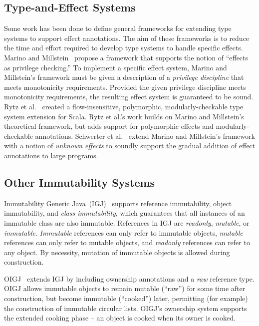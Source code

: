 \documentclass[letterpaper,11pt]{article}
\theoremstyle{definition}
\theoremstyle{remark}
\begin{document}
\subsection{Type-and-Effect Systems}

Some work has been done to define general frameworks for extending type systems
to support effect annotations. The aim of these frameworks is to reduce the
time and effort required to develop type systems to handle specific effects.
Marino and Millstein~\cite{generic-type-and-effect} propose a framework that
supports the notion of ``effects as privilege checking.''
To implement a specific effect system, Marino and Millstein's framework must be
given a description of a \emph{privilege discipline} that meets monotonicity requirements.
Provided the given privilege discipline meets monotonicity requirements,
the resulting effect system is guaranteed to be sound.
Rytz et al.~\cite{lightweight-polymorphic-effects,rytz-thesis} created a
flow-insensitive, polymorphic, modularly-checkable type system extension
for Scala. Rytz et al.'s work builds on Marino and Millstein's theoretical framework,
but adds support for polymorphic effects and modularly-checkable annotations.
Schwerter et al.~\cite{gradual-effect-systems} extend Marino and Millstein's framework
with a notion of \emph{unknown effects} to soundly support the gradual addition of effect
annotations to large programs.


\subsection{Other Immutability Systems}
\label{other-immutability-systems}

Immutability Generic Java~(IGJ)~\cite{igj}
supports reference immutability, object immutability, and \emph{class immutability},
which guarantees that all instances of an immutable class are also immutable.
References in IGJ are \emph{readonly}, \emph{mutable}, or \emph{immutable}.
\emph{Immutable} references can only refer to immutable objects,
\emph{mutable} references can only refer to mutable objects,
and \emph{readonly} references can refer to any object.
By necessity, mutation of immutable objects is allowed during construction.

OIGJ~\cite{oigj} extends IGJ by including ownership annotations
and a \emph{raw} reference type.
OIGJ allows immutable objects to remain mutable (``raw'') for some time after construction,
but become immutable (``cooked'') later, permitting (for example) the construction of immutable circular lists.
OIGJ's ownership system supports the extended cooking phase --
an object is cooked when its owner is cooked.
\end{document}
